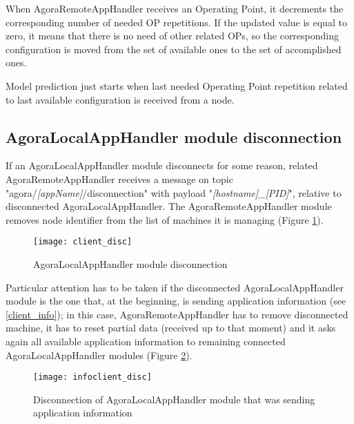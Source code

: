 When AgoraRemoteAppHandler receives an Operating Point, it decrements the corresponding number of needed OP repetitions. If the updated value is equal to zero, it means that there is no need of other related OPs, so the corresponding configuration is moved from the set of available ones to the set of accomplished ones.

Model prediction just starts when last needed Operating Point repetition related to last available configuration is received from a node.





\subsection{AgoraLocalAppHandler module disconnection}\label{client_disc}

If an AgoraLocalAppHandler module disconnects for some reason, related Agora\-Remote\-App\-Handler receives a message on topic "agora\slash{}\textit{[appName]}\slash{}dis\-con\-nec\-tion" with payload "\textit{[hostname]\_[PID]}", relative to disconnected AgoraLocalAppHandler. The AgoraRemote\-App\-Handler module removes node identifier from the list of machines it is managing (Figure \ref{fig::locDisc}).

\begin{figure}[ht]

    \centering
    \texttt{[image: client\_disc]}
    \caption{AgoraLocalAppHandler module disconnection}

    \label{fig::locDisc}
    
\end{figure}

Particular attention has to be taken if the disconnected AgoraLocalAppHandler module is the one that, at the beginning, is sending application information (see \ref{client_info}); in this case, AgoraRemoteAppHandler has to remove disconnected machine, it has to reset partial data (received up to that moment) and it asks again all available application information to remaining connected Agora\-Local\-App\-Handler modules (Figure \ref{fig::locInfoDisc}).

\begin{figure}[hb]

    \centering
    \texttt{[image: infoclient\_disc]}
    \caption{Disconnection of AgoraLocalAppHandler module that was sending application information}

    \label{fig::locInfoDisc}
    
\end{figure}





